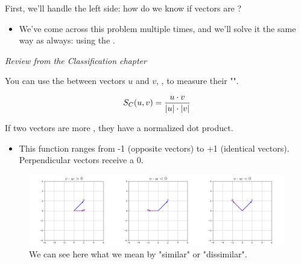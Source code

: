         First, we'll handle the left side: how do we know if vectors are ? 
        
        \begin{itemize}
            \item We've come across this problem multiple times, and we'll solve it the same way as always: using the .\\
        \end{itemize}

        \begin{concept}
            \textit{Review from the Classification chapter}
            
            You can use the  between vectors $u$ and $v$, , to measure their "". 

            \begin{equation*}
                S_C(u,v) = \frac{u \cdot v}{\abs{u} \cdot \abs{v}}
            \end{equation*}
            
            If two vectors are more , they have a  normalized dot product. 

            \begin{itemize}
                \item This function ranges from -1 (opposite vectors) to +1 (identical vectors). Perpendicular vectors receive a 0.
            \end{itemize}
        \end{concept}


        \begin{figure}[H]
            \centering
            \includegraphics[width=140mm,scale=0.5]{images/transformers_images/dot_product_demo.png}
            
            
            \caption*{We can see here what we mean by "similar" or "dissimilar".}
        \end{figure}

